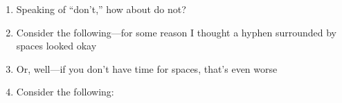 \documentclass{amsart}
\begin{document}
\begin{enumerate}[(1)]
\item Speaking %
of ``don't,'' how %
about do not?

\item Consider %
the following---for some %
reason I thought a hyphen surrounded by spaces looked okay

\item %
Or, well---if you %
don't have time for spaces, that's even worse

\item Consider %
the following: %
\end{enumerate}
\end{document}
